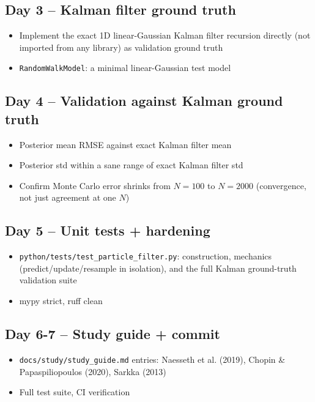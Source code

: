 \documentclass[11pt]{article}
\begin{document}
\subsection*{Day 3 -- Kalman filter ground truth}
\begin{itemize}[leftmargin=*]
  \item Implement the exact 1D linear-Gaussian Kalman filter recursion
    directly (not imported from any library) as validation ground
    truth
  \item \texttt{RandomWalkModel}: a minimal linear-Gaussian test model
\end{itemize}

\subsection*{Day 4 -- Validation against Kalman ground truth}
\begin{itemize}[leftmargin=*]
  \item Posterior mean RMSE against exact Kalman filter mean
  \item Posterior std within a sane range of exact Kalman filter std
  \item Confirm Monte Carlo error shrinks from $N=100$ to $N=2000$
    (convergence, not just agreement at one $N$)
\end{itemize}

\subsection*{Day 5 -- Unit tests + hardening}
\begin{itemize}[leftmargin=*]
  \item \texttt{python/tests/test\_particle\_filter.py}: construction,
    mechanics (predict/update/resample in isolation), and the full
    Kalman ground-truth validation suite
  \item mypy strict, ruff clean
\end{itemize}

\subsection*{Day 6-7 -- Study guide + commit}
\begin{itemize}[leftmargin=*]
  \item \texttt{docs/study/study\_guide.md} entries: Naesseth et al.
    (2019), Chopin \& Papaspiliopoulos (2020), Sarkka (2013)
  \item Full test suite, CI verification
\end{itemize}
\end{document}
